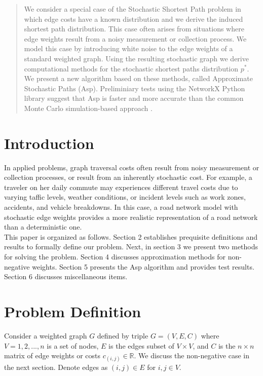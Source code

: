 \documentclass[twocolumn]{article}
\begin{document}


%

\begin{abstract}
We consider a special case of the Stochastic Shortest Path problem in which edge costs have a known distribution and we derive the induced shortest path distribution. This case often arises from situations where edge weights result from a noisy measurement or collection process. We model this case by introducing white noise to the edge weights of a standard weighted graph. Using the resulting stochastic graph we derive computational methods for the stochastic shortest paths distribution $p^*$. We present a new algorithm based on these methods, called Approximate Stochastic Paths (Asp). Preliminiary tests using the NetworkX Python library \cite{netx} suggest that Asp is faster and more accurate than the common Monte Carlo simulation-based approach \cite{frank_1969}.
\end{abstract}




\section{Introduction}
In applied problems, graph traversal costs often result from noisy measurement or collection processes, or result from an inherently stochastic cost. For example, a traveler on her daily commute may experiences different travel costs due to varying taffic levels, weather conditions, or incident levels such as work zones, accidents, and vehicle breakdowns. In this case, a road network model with stochastic edge weights provides a more realistic representation of a road network than a deterministic one.\\

This paper is organized as follows. Section 2 establishes prequisite definitions and results to formally define our problem. Next, in section 3  we present two methods for solving the problem. Section 4 discusses approximation methods for non-negative weights. Section 5 presents the Asp algorithm and provides test results. Section 6 discusses miscellaneous items. 




\section{Problem Definition}
Consider a weighted graph $G$ defined by triple $G = (V, E,C)$ where $V = {1, 2, . . . , n}$ is a set of nodes, $E$  is the edges subset of $V \times V$, and $C$ is the $n \times n$ matrix of edge weights or costs $c_{(i,j)} \in {{\mathbb R}}$. We discuss the non-negative case in the next section. Denote edges as $(i,j) \in E$ for $i,j \in V$.
\end{document}

